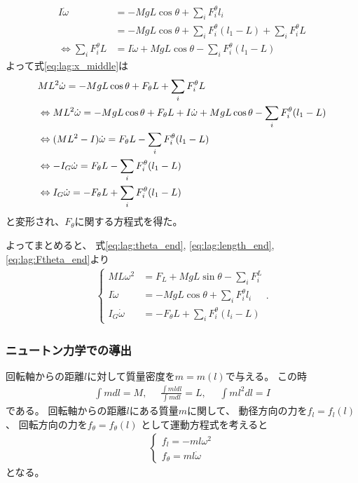 \documentclass[a4paper,11pt]{jsarticle}
\begin{document}
\begin{align*}
  I\dot\omega 
  &= -MgL\cos\theta + \sum_i F_i^\theta l_i
  \\
  &= -MgL\cos\theta + \sum_i F_i^\theta (l_1 - L) + \sum_i F_i^\theta L
  \\
  \Leftrightarrow
  \sum_i F_i^\theta L
  &= I\dot\omega + MgL\cos\theta - \sum_i F_i^\theta (l_1 - L)
\end{align*}
よって式\ref{eq:lag:x_middle}は
\begin{align}
  & M L^2 \dot\omega = - Mg L \cos\theta + F_\theta L + \sum_i F_i^\theta L
  \notag
  \\
  & \Leftrightarrow
  M L^2 \dot\omega = - Mg L \cos\theta + F_\theta L + I\dot\omega + MgL\cos\theta - \sum_i F_i^\theta (l_1 - L)
  \notag
  \\
  & \Leftrightarrow
  ( M L^2 - I ) \dot\omega = F_\theta L - \sum_i F_i^\theta (l_1 - L)
  \notag
  \\
  & \Leftrightarrow
  -I_G \dot\omega = F_\theta L - \sum_i F_i^\theta (l_1 - L)
  \notag
  \\
  & \Leftrightarrow
  I_G \dot\omega = - F_\theta L + \sum_i F_i^\theta (l_1 - L)
  \label{eq:lag:Ftheta_end}
\end{align}
と変形され、$F_\theta$に関する方程式を得た。

よってまとめると、
式\ref{eq:lag:theta_end}, \ref{eq:lag:length_end}, \ref{eq:lag:Ftheta_end}より
\begin{align*}
  \begin{cases}
    ML\omega^2 &= F_L + MgL\sin\theta - \sum_i F_i^L
    \\
    I\dot\omega &= -MgL\cos\theta + \sum_i F_i^\theta l_i
    \\
    I_G\dot\omega &= -F_\theta L + \sum_i F_i^\theta ( l_i - L )
  \end{cases}.
\end{align*}

\clearpage
\subsubsection{ニュートン力学での導出}
\label{subsubsec:newton}

回転軸からの距離$l$に対して質量密度を$m=m(l)$で与える。
この時
\begin{align*}
  \int m dl = M, \ \ \ \ \ \
  \frac{\int ml dl}{\int m dl} = L, \ \ \ \ \ \
  \int ml^2 dl = I
\end{align*}
である。
回転軸からの距離$l$にある質量$m$に関して、
動径方向の力を$f_l=f_l(l)$、
回転方向の力を$f_\theta=f_\theta(l)$
として運動方程式を考えると
\begin{align*}
  \begin{cases}
    f_l = -ml\omega^2
    \\
    f_\theta = ml\dot\omega
  \end{cases}
\end{align*}
となる。
\end{document}
